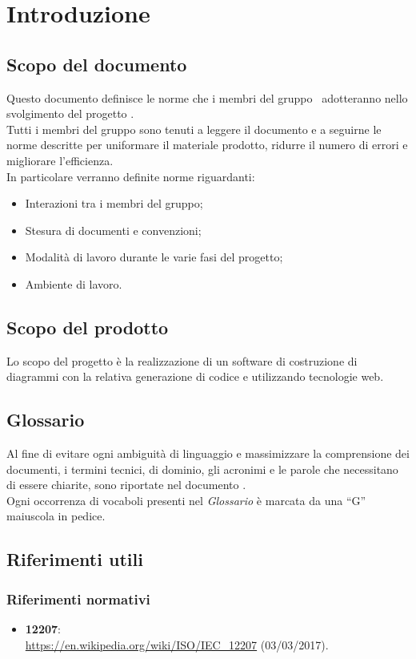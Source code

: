 \documentclass[../NormeDiProgetto.tex]{subfiles}
\begin{document}
	\section{Introduzione}
		\subsection{Scopo del documento}
			Questo documento definisce le norme che i membri del gruppo
			\kaleidoscode\ adotteranno nello svolgimento del progetto
			\progetto.\\
			Tutti i membri del gruppo sono tenuti a leggere il documento
			e a seguirne le norme descritte per uniformare il materiale
			prodotto, ridurre il numero di errori e migliorare l'efficienza.\\
			In particolare verranno definite norme riguardanti:
			\begin{itemize}
				\item Interazioni tra i membri del gruppo;
				\item Stesura di documenti e convenzioni;
				\item Modalità di lavoro durante le varie fasi del progetto;
				\item Ambiente di lavoro.
			\end{itemize}
		\subsection{Scopo del prodotto}
			Lo scopo del progetto è la realizzazione di un software di
			costruzione di diagrammi  con la relativa generazione
			di codice  e  utilizzando tecnologie
			web.
		\subsection{Glossario}
			Al fine di evitare ogni ambiguità di linguaggio e massimizzare la
			comprensione dei documenti, i termini tecnici, di dominio, gli
			acronimi e le parole che necessitano di essere chiarite, sono
			riportate nel documento \glossariov.\\
			Ogni occorrenza di vocaboli presenti nel \textit{Glossario} è
			marcata da una ``G'' maiuscola in pedice.
		\subsection{Riferimenti utili}
			\subsubsection{Riferimenti normativi}
    			\begin{itemize}
    				\item \textbf{ 12207}:\\
    				\url{https://en.wikipedia.org/wiki/ISO/IEC_12207} (03/03/2017).
				\end{itemize}
\end{document}
